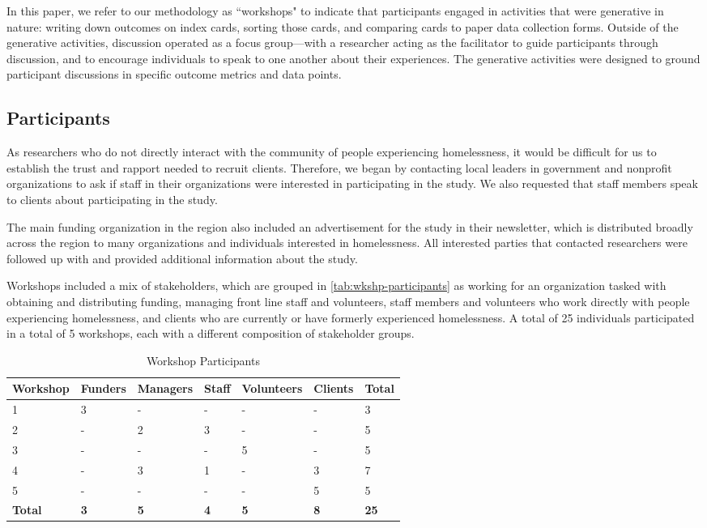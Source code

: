 In this paper, we refer to our methodology as ``workshops" to indicate that participants engaged in activities that were generative in nature: writing down outcomes on index cards, sorting those cards, and comparing cards to paper data collection forms. Outside of the generative activities, discussion operated as a focus group---with a researcher acting as the facilitator to guide participants through discussion, and to encourage individuals to speak to one another about their experiences. The generative activities were designed to ground participant discussions in specific outcome metrics and data points.

\subsection{Participants}
As researchers who do not directly interact with the community of people experiencing homelessness, it would be difficult for us to establish the trust and rapport needed to recruit clients. Therefore, we began by contacting local leaders in government and nonprofit organizations to ask if staff in their organizations were interested in participating in the study. We also requested that staff members speak to clients about participating in the study.

The main funding organization in the region also included an advertisement for the study in their newsletter, which is distributed broadly across the region to many organizations and individuals interested in homelessness. All interested parties that contacted researchers were followed up with and provided additional information about the study.

Workshops included a mix of stakeholders, which are grouped in \autoref{tab:wkshp-participants} as working for an organization tasked with obtaining and distributing funding, managing front line staff and volunteers, staff members and volunteers who work directly with people experiencing homelessness, and clients who are currently or have formerly experienced homelessness. A total of 25 individuals participated in a total of 5 workshops, each with a different composition of stakeholder groups.

\begin{table}
\begin{tabularx}{\textwidth}{X|XXXXX|X}
\toprule
\textbf{Workshop} & \textbf{Funders} & \textbf{Managers} & \textbf{Staff} & \textbf{Volunteers} & \textbf{Clients} & \textbf{Total} \\
\midrule
1 & 3 & - & - & - & - & 3 \\
2 & - & 2 & 3 & - & - & 5 \\
3 & - & - & - & 5 & - & 5 \\
4 & - & 3 & 1 & - & 3 & 7 \\
5 & - & - & - & - & 5 & 5 \\
\midrule
\textbf{Total} & \textbf{3} & \textbf{5} & \textbf{4} & \textbf{5} & \textbf{8} & \textbf{25} \\
\bottomrule
\end{tabularx}
\caption{Workshop Participants}
\label{tab:wkshp-participants}
\end{table}

